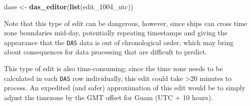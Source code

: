 \documentclass[
]{book}
\newenvironment{Shaded}{\begin{snugshade}}{\end{snugshade}}
\newcommand{\CommentTok}[1]{\textcolor[rgb]{0.56,0.35,0.01}{\textit{#1}}}
\newcommand{\DecValTok}[1]{\textcolor[rgb]{0.00,0.00,0.81}{#1}}
\newcommand{\FunctionTok}[1]{\textcolor[rgb]{0.13,0.29,0.53}{\textbf{#1}}}
\newcommand{\NormalTok}[1]{#1}
\newcommand{\OtherTok}[1]{\textcolor[rgb]{0.56,0.35,0.01}{#1}}
\newcommand{\SpecialCharTok}[1]{\textcolor[rgb]{0.81,0.36,0.00}{\textbf{#1}}}
\newcommand{\StringTok}[1]{\textcolor[rgb]{0.31,0.60,0.02}{#1}}
\begin{document}
\begin{Shaded}
\begin{Highlighting}[]
\NormalTok{dase }\OtherTok{\textless{}{-}} \FunctionTok{das\_editor}\NormalTok{(}\FunctionTok{list}\NormalTok{(edit\_1004\_utc))}
\end{Highlighting}
\end{Shaded}

\begin{Shaded}
\end{Shaded}

Note that this type of edit can be dangerous, however, since ships can cross time zone boundaries mid-day, potentially repeating timestamps and giving the appearance that the \texttt{DAS} data is out of chronological order, which may bring about consequences for data processing that are difficult to predict.

This type of edit is also time-consuming; since the time zone needs to be calculated in each \texttt{DAS} row individually, this edit could take \textgreater20 minutes to process. An expedited (and safer) approximation of this edit would be to simply adjust the timezone by the GMT offset for Guam (UTC + 10 hours).
\end{document}
